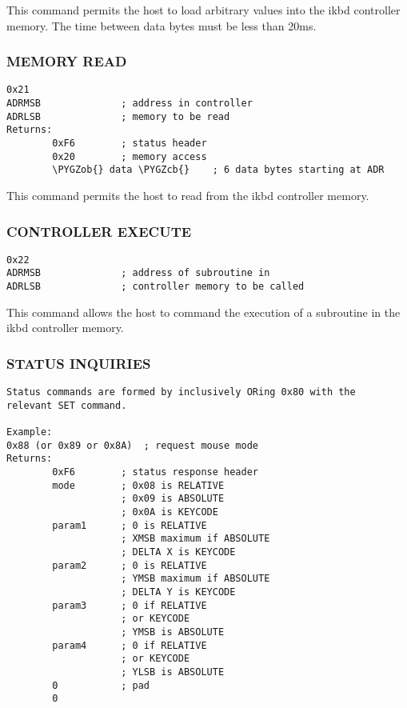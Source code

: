 \documentclass[a4paper,8pt,english]{sphinxmanual}
\def\PYGZob{\char`\{}
\def\PYGZcb{\char`\}}
\begin{document}
This command permits the host to load arbitrary values into the ikbd
controller memory. The time between data bytes must be less than 20ms.


\subsubsection{MEMORY READ}
\label{input/devices/atarikbd:memory-read}
\begin{Verbatim}[commandchars=\\\{\}]
0x21
ADRMSB              ; address in controller
ADRLSB              ; memory to be read
Returns:
        0xF6        ; status header
        0x20        ; memory access
        \PYGZob{} data \PYGZcb{}    ; 6 data bytes starting at ADR
\end{Verbatim}

This command permits the host to read from the ikbd controller memory.


\subsubsection{CONTROLLER EXECUTE}
\label{input/devices/atarikbd:controller-execute}
\begin{Verbatim}[commandchars=\\\{\}]
0x22
ADRMSB              ; address of subroutine in
ADRLSB              ; controller memory to be called
\end{Verbatim}

This command allows the host to command the execution of a subroutine in the
ikbd controller memory.


\subsubsection{STATUS INQUIRIES}
\label{input/devices/atarikbd:id1}
\begin{Verbatim}[commandchars=\\\{\}]
Status commands are formed by inclusively ORing 0x80 with the
relevant SET command.

Example:
0x88 (or 0x89 or 0x8A)  ; request mouse mode
Returns:
        0xF6        ; status response header
        mode        ; 0x08 is RELATIVE
                    ; 0x09 is ABSOLUTE
                    ; 0x0A is KEYCODE
        param1      ; 0 is RELATIVE
                    ; XMSB maximum if ABSOLUTE
                    ; DELTA X is KEYCODE
        param2      ; 0 is RELATIVE
                    ; YMSB maximum if ABSOLUTE
                    ; DELTA Y is KEYCODE
        param3      ; 0 if RELATIVE
                    ; or KEYCODE
                    ; YMSB is ABSOLUTE
        param4      ; 0 if RELATIVE
                    ; or KEYCODE
                    ; YLSB is ABSOLUTE
        0           ; pad
        0
\end{Verbatim}
\end{document}

